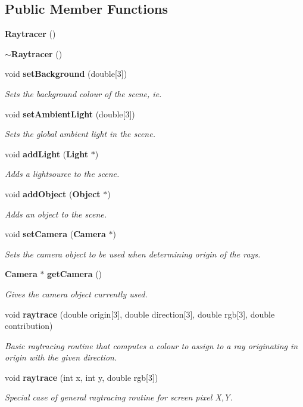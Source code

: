 \subsection*{Public Member Functions}
\begin{DoxyCompactItemize}
\item 
{\bf Raytracer} ()
\item 
{\bf $\sim$\+Raytracer} ()
\item 
void {\bf set\+Background} (double[3])
\begin{DoxyCompactList}\small\item\em Sets the background colour of the scene, ie. \end{DoxyCompactList}\item 
void {\bf set\+Ambient\+Light} (double[3])
\begin{DoxyCompactList}\small\item\em Sets the global ambient light in the scene. \end{DoxyCompactList}\item 
void {\bf add\+Light} ({\bf Light} $\ast$)
\begin{DoxyCompactList}\small\item\em Adds a lightsource to the scene. \end{DoxyCompactList}\item 
void {\bf add\+Object} ({\bf Object} $\ast$)
\begin{DoxyCompactList}\small\item\em Adds an object to the scene. \end{DoxyCompactList}\item 
void {\bf set\+Camera} ({\bf Camera} $\ast$)
\begin{DoxyCompactList}\small\item\em Sets the camera object to be used when determining origin of the rays. \end{DoxyCompactList}\item 
{\bf Camera} $\ast$ {\bf get\+Camera} ()
\begin{DoxyCompactList}\small\item\em Gives the camera object currently used. \end{DoxyCompactList}\item 
void {\bf raytrace} (double origin[3], double direction[3], double rgb[3], double contribution)
\begin{DoxyCompactList}\small\item\em Basic raytracing routine that computes a colour to assign to a ray originating in origin with the given direction. \end{DoxyCompactList}\item 
void {\bf raytrace} (int x, int y, double rgb[3])
\begin{DoxyCompactList}\small\item\em Special case of general raytracing routine for screen pixel X,Y. \end{DoxyCompactList}\end{DoxyCompactItemize}
